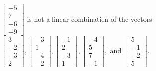 \begin{exercise}
\begin{exerciseStatement}
  \end{exerciseStatement}
  \begin{exerciseAnswer}
   \(\left[\begin{array}{c}
-5 \\
7 \\
-6 \\
-9
\end{array}\right]\) 
  	 is not  
	a linear combination of the vectors \(\left[\begin{array}{c}
3 \\
-2 \\
-3 \\
2
\end{array}\right] , \left[\begin{array}{c}
-3 \\
1 \\
-4 \\
-2
\end{array}\right] , \left[\begin{array}{c}
-1 \\
2 \\
-3 \\
1
\end{array}\right] , \left[\begin{array}{c}
-4 \\
5 \\
7 \\
-1
\end{array}\right] , \text{ and } \left[\begin{array}{c}
5 \\
-1 \\
-2 \\
5
\end{array}\right]\).

	
  


  \end{exerciseAnswer}
\end{exercise}
